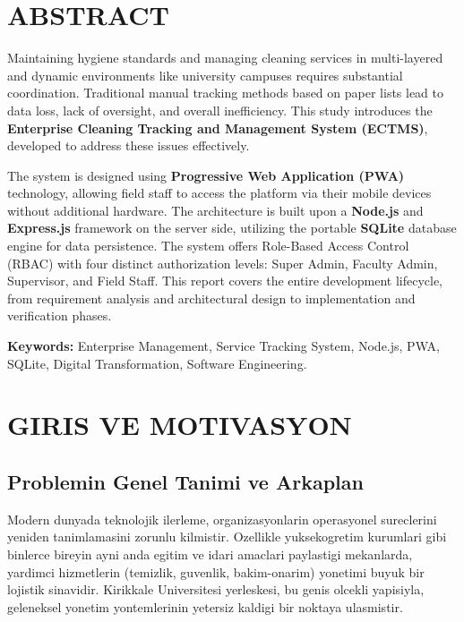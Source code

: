\documentclass[12pt,a4paper,oneside]{report}
\begin{document}
\chapter*{ABSTRACT}

Maintaining hygiene standards and managing cleaning services in multi-layered and dynamic environments like university campuses requires substantial coordination. Traditional manual tracking methods based on paper lists lead to data loss, lack of oversight, and overall inefficiency. This study introduces the \textbf{Enterprise Cleaning Tracking and Management System (ECTMS)}, developed to address these issues effectively.

The system is designed using \textbf{Progressive Web Application (PWA)} technology, allowing field staff to access the platform via their mobile devices without additional hardware. The architecture is built upon a \textbf{Node.js} and \textbf{Express.js} framework on the server side, utilizing the portable \textbf{SQLite} database engine for data persistence. The system offers Role-Based Access Control (RBAC) with four distinct authorization levels: Super Admin, Faculty Admin, Supervisor, and Field Staff. This report covers the entire development lifecycle, from requirement analysis and architectural design to implementation and verification phases.

\textbf{Keywords:} Enterprise Management, Service Tracking System, Node.js, PWA, SQLite, Digital Transformation, Software Engineering.

\tableofcontents
\listoffigures
\listoftables

\chapter{GIRIS VE MOTIVASYON}
\label{chap:giris}

\section{Problemin Genel Tanimi ve Arkaplan}

Modern dunyada teknolojik ilerleme, organizasyonlarin operasyonel sureclerini yeniden tanimlamasini zorunlu kilmistir. Ozellikle yuksekogretim kurumlari gibi binlerce bireyin ayni anda egitim ve idari amaclari paylastigi mekanlarda, yardimci hizmetlerin (temizlik, guvenlik, bakim-onarim) yonetimi buyuk bir lojistik sinavidir. Kirikkale Universitesi yerleskesi, bu genis olcekli yapisiyla, geleneksel yonetim yontemlerinin yetersiz kaldigi bir noktaya ulasmistir.
\end{document}
